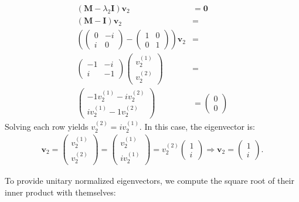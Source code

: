 \documentclass[letterpaper,11pt,twoside]{article}
\begin{document}
\begin{itemize}
  \begin{align*}
    (\bm{M}-\lambda_2\bm{I})\bm{v}_2&=\bm{0}\\
    (\bm{M}-\bm{I})\bm{v}_2&=\\
    \left(\begin{pmatrix}
      0&-i\\i&0
    \end{pmatrix}-\begin{pmatrix}
      1&0\\0&1
    \end{pmatrix}\right)\bm{v}_2&=\\
    \begin{pmatrix}
      -1&-i\\i&-1
    \end{pmatrix}\begin{pmatrix}
    v_2^{(1)}\\v_2^{(2)}
    \end{pmatrix}&=\\
    \begin{pmatrix}
      -1v_2^{(1)}-iv_2^{(2)}\\
      iv_2^{(1)}-1v_2^{(2)}
    \end{pmatrix}&=\begin{pmatrix}
      0\\0
    \end{pmatrix}
  \end{align*}
  Solving each row yields $v_2^{(2)}=iv_2^{(1)}$. In this case, the eigenvector is:
  \begin{align*}
    \bm{v}_2=\begin{pmatrix}
    v_2^{(1)}\\v_2^{(2)}
    \end{pmatrix}=\begin{pmatrix}
      v_2^{(1)}\\iv_2^{(1)}
    \end{pmatrix}=v_2^{(2)}\begin{pmatrix}
      1\\i
    \end{pmatrix}\Longrightarrow\bm{v}_2=\begin{pmatrix}
      1\\i
    \end{pmatrix}.
  \end{align*}
\end{itemize}
To provide unitary normalized eigenvectors, we compute the square root of their inner product with themselves:
\end{document}
